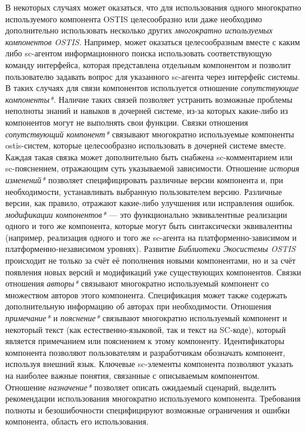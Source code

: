 В некоторых случаях может оказаться, что для использования одного многократно используемого компонента OSTIS целесообразно или даже необходимо дополнительно использовать несколько других \textit{многократно используемых компонентов OSTIS}. Например, может оказаться целесообразным вместе с каким либо sc-агентом информационного поиска использовать соответствующую команду интерфейса, которая представлена отдельным компонентом и позволит пользователю задавать вопрос для указанного sc-агента через интерфейс системы. В таких случаях для связи компонентов используется отношение \textit{сопутствующие компоненты*}. Наличие таких связей позволяет устранить возможные проблемы неполноты знаний и навыков в дочерней системе, из-за которых какие-либо из компонентов могут не выполнять свои функции. Связки отношения \textit{сопутствующий компонент*} связывают многократно используемые компоненты ostis-систем, которые целесообразно использовать в дочерней системе вместе. Каждая такая связка может дополнительно быть снабжена sc-комментарием или sc-пояснением, отражающим суть указываемой зависимости. Отношение \textit{история изменений*} позволяет специфицировать различные версии компонента и, при необходимости, устанавливать выбранную пользователем версию. Различные версии, как правило, отражают какие-либо улучшения или исправления ошибок. \textit{модификации компонентов*} --- это функционально эквивалентные реализации одного и того же компонента, которые могут быть синтаксически эквивалентны (например, реализация одного и того же sc-агента на платформенно-зависимом и платформенно-независимом уровнях). Развитие \textit{Библиотеки Экосистемы OSTIS} происходит не только за счёт её пополнения новыми компонентами, но и за счёт появления новых версий и модификаций уже существующих компонентов. Связки отношения \textit{авторы*} связывают многократно используемый компонент со множеством авторов этого компонента. Спецификация может также содержать дополнительную информацию об авторах при необходимости. Отношения \textit{примечание*} и \textit{пояснение*} связывают многократно используемый компонент и некоторый текст (как естественно-языковой, так и текст на SC-коде), который является примечанием или пояснением к этому компоненту. Идентификаторы компонента позволяют пользователям и разработчикам обозначать компонент, используя внешний язык. Ключевые sc-элементы компонента позволяют указать на наиболее важные понятия, связанные с описываемым компонентом. Отношение \textit{назначение*} позволяет описать ожидаемый сценарий, выделить рекомендации использования многократно используемого компонента. Требования полноты и безошибочности специфицируют возможные ограничения и ошибки компонента, область его использования.

